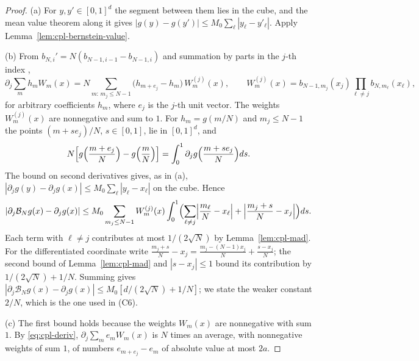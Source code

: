 \begin{proof}
(a) For $y,y'\in[0,1]^d$ the segment between them lies in the cube, and the mean value theorem along it gives
$|g(y)-g(y')|\le M_0\sum_\ell|y_\ell-y'_\ell|$. Apply Lemma~\ref{lem:cpl-bernstein-value}.

(b) From $b_{N,i}'=N(b_{N-1,i-1}-b_{N-1,i})$ and summation by parts in the $j$-th index
\cite[\S1.4]{Lorentz1986},
\begin{equation}\label{eq:cpl-deriv}
 \partial_j\sum_mh_mW_m(x)=N\sum_{m:\,m_j\le N-1}\bigl(h_{m+e_j}-h_m\bigr)\,W^{(j)}_m(x),\qquad
 W^{(j)}_m(x)=b_{N-1,m_j}(x_j)\prod_{\ell\ne j}b_{N,m_\ell}(x_\ell),
\end{equation}
for arbitrary coefficients $h_m$, where $e_j$ is the $j$-th unit vector. The weights $W^{(j)}_m(x)$ are nonnegative
and sum to $1$. For $h_m=g(m/N)$ and $m_j\le N-1$ the points $(m+se_j)/N$, $s\in[0,1]$, lie in $[0,1]^d$, and
\[
 N\Bigl[g\Bigl(\frac{m+e_j}N\Bigr)-g\Bigl(\frac mN\Bigr)\Bigr]=\int_0^1\partial_jg\Bigl(\frac{m+se_j}N\Bigr)ds .
\]
The bound on second derivatives gives, as in (a), $|\partial_jg(y)-\partial_jg(x)|\le M_0\sum_\ell|y_\ell-x_\ell|$ on
the cube. Hence
\[
 |\partial_j\mathcal B_Ng(x)-\partial_jg(x)|
 \le M_0\sum_{m_j\le N-1}W^{(j)}_m(x)\int_0^1\Bigl(\sum_{\ell\ne j}\Bigl|\frac{m_\ell}N-x_\ell\Bigr|
 +\Bigl|\frac{m_j+s}N-x_j\Bigr|\Bigr)ds .
\]
Each term with $\ell\ne j$ contributes at most $1/(2\sqrt N)$ by Lemma~\ref{lem:cpl-mad}. For the differentiated
coordinate write $\frac{m_j+s}N-x_j=\frac{m_j-(N-1)x_j}N+\frac{s-x_j}N$; the second bound of
Lemma~\ref{lem:cpl-mad} and $|s-x_j|\le1$ bound its contribution by $1/(2\sqrt N)+1/N$. Summing gives
$|\partial_j\mathcal B_Ng(x)-\partial_jg(x)|\le M_0[d/(2\sqrt N)+1/N]$; we state the weaker constant $2/N$, which is
the one used in (C6).

(c) The first bound holds because the weights $W_m(x)$ are nonnegative with sum $1$. By \eqref{eq:cpl-deriv},
$\partial_j\sum_me_mW_m(x)$ is $N$ times an average, with nonnegative weights of sum $1$, of numbers
$e_{m+e_j}-e_m$ of absolute value at most $2a$.
\end{proof}


